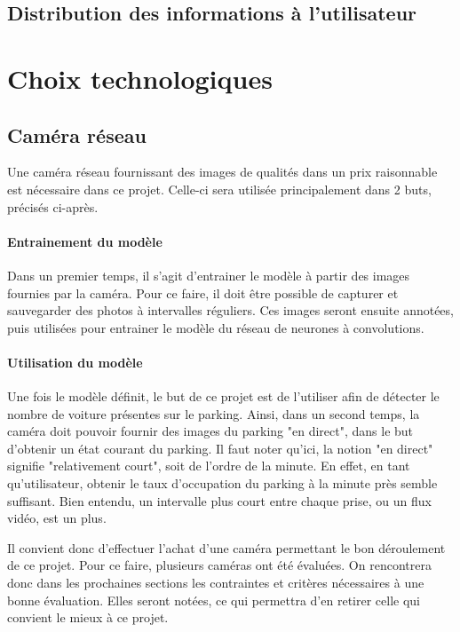 \subsection{Distribution des informations à l'utilisateur}


\section{Choix technologiques}

\subsection{Caméra réseau}\label{conception.techno.camera}
Une caméra réseau fournissant des images de qualités dans un prix raisonnable est nécessaire dans ce projet. Celle-ci sera utilisée principalement dans 2 buts, précisés ci-après.

\paragraph{Entrainement du modèle}
Dans un premier temps, il s'agit d'entrainer le modèle à partir des images fournies par la caméra. Pour ce faire, il doit être possible de capturer et sauvegarder des photos à intervalles réguliers. Ces images seront ensuite annotées, puis utilisées pour entrainer le modèle du réseau de neurones à convolutions. 

\paragraph{Utilisation du modèle}
Une fois le modèle définit, le but de ce projet est de l'utiliser afin de détecter le nombre de voiture présentes sur le parking. Ainsi, dans un second temps, la caméra doit pouvoir fournir des images du parking "en direct", dans le but d'obtenir un état courant du parking. Il faut noter qu'ici, la notion "en direct" signifie "relativement court", soit de l'ordre de la minute. En effet, en tant qu'utilisateur, obtenir le taux d'occupation du parking à la minute près semble suffisant. Bien entendu, un intervalle plus court entre chaque prise, ou un flux vidéo, est un plus.

Il convient donc d'effectuer l'achat d'une caméra permettant le bon déroulement de ce projet. Pour ce faire, plusieurs caméras ont été évaluées. On rencontrera donc dans les prochaines sections les contraintes et critères nécessaires à une bonne évaluation. Elles seront notées, ce qui permettra d'en retirer celle qui convient le mieux à ce projet.

